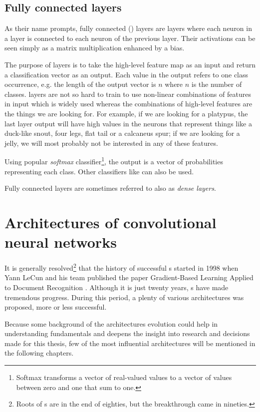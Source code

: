 \subsection{Fully connected layers}
\label{fc-layers}

As their name prompts, fully connected () layers are layers where each 
neuron in a layer is connected to each neuron of the previous layer. Their 
activations can be seen simply as a matrix multiplication enhanced by a bias.  

The purpose of  layers is to take the high-level feature map as an input 
and return a classification vector as an output. Each value in the output refers 
to one class occurrence, e.g. the length of the output vector is $n$ where $n$ 
is the number of classes.  layers are not so hard to train to use 
non-linear combinations of features in input which is widely used whereas the 
combinations of high-level features are the things we are looking for. For 
example, if we are looking for a platypus, the last layer output will have high 
values in the neurons that represent things like a duck-like snout, four legs, 
flat tail or a calcaneus spur; if we are looking for a jelly, we will most 
probably not be interested in any of these features. 

Using popular \textit{softmax} classifier\footnote{Softmax transforms a vector 
of real-valued values to a vector of values between zero and one that sum to 
one.}, the output is a vector of probabilities representing each class. Other 
classifiers like  can also be used. 

Fully connected layers are sometimes referred to also as \textit{dense layers}.

\section{Architectures of convolutional neural networks}
\label{cnn-architectures}

It is generally resolved\footnote{Roots of s are in the end of eighties, 
but the breakthrough came in nineties.} that the history of successful s 
started in 1998 when Yann LeCun and his team published the paper Gradient-Based 
Learning Applied to Document Recognition \cite{lenet5}. Although it is just 
twenty years, s have made tremendous progress. During this period, a 
plenty of various architectures was proposed, more or less successful.

Because some background of the  architectures evolution could help in 
understanding  fundamentals and deepens the insight into research and 
decisions made for this thesis, few of the most influential architectures will be 
mentioned in the following chapters.

